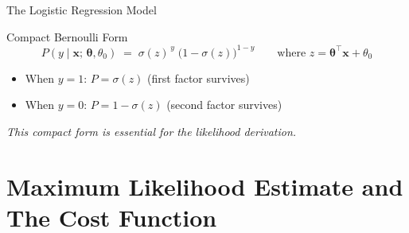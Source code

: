 \documentclass[aspectratio=169,11pt]{beamer}
\begin{document}
\begin{frame}{The Logistic Regression Model}
\begin{center}
\end{center}

\vspace{0.5em}
\begin{block}{Compact Bernoulli Form}
\[
  P(y\mid\boldsymbol{x};\,\boldsymbol{\theta},\theta_0) \;=\; \sigma(z)^{\,y}\;\bigl(1-\sigma(z)\bigr)^{1-y} \qquad\text{where }z = \boldsymbol{\theta}^\top\boldsymbol{x}+\theta_0
\]
\end{block}
\smallskip
\begin{itemize}
  \item When $y=1$: $P = \sigma(z)$ \quad (first factor survives)
  \item When $y=0$: $P = 1-\sigma(z)$ \quad (second factor survives)
\end{itemize}
\smallskip
\centering\footnotesize\textit{This compact form is essential for the likelihood derivation.}
\end{frame}

\section{Maximum Likelihood Estimate and The Cost Function}
\end{document}
